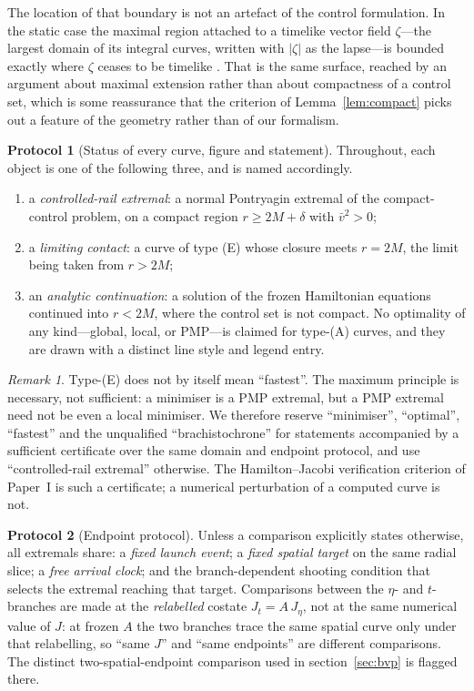 \documentclass[12pt]{iopart}
\theoremstyle{plain}
\theoremstyle{definition}
\newtheorem{protocol}{Protocol}
\theoremstyle{remark}
\newtheorem{remark}[proposition]{Remark}
\begin{document}
The location of that boundary is not an artefact of the control formulation. In
the static case the maximal region attached to a timelike vector field
$\zeta$---the largest domain of its integral curves, written with $|\zeta|$ as
the lapse---is bounded exactly where $\zeta$ ceases to be timelike
\cite{Lecian2025Cauchy}. That is the same surface, reached by an argument about
maximal extension rather than about compactness of a control set, which is some
reassurance that the criterion of Lemma~\ref{lem:compact} picks out a feature of
the geometry rather than of our formalism.

\begin{protocol}[Status of every curve, figure and statement]
\label{prot:status}
Throughout, each object is one of the following three, and is named accordingly.
\begin{enumerate}
\item[\rm(E)] a \emph{controlled-rail extremal}: a normal Pontryagin extremal of
the compact-control problem, on a compact region $r\ge2M+\delta$ with
$\bar v^2>0$;
\item[\rm(C)] a \emph{limiting contact}: a curve of type (E) whose closure meets
$r=2M$, the limit being taken from $r>2M$;
\item[\rm(A)] an \emph{analytic continuation}: a solution of the frozen
Hamiltonian equations continued into $r<2M$, where the control set is not
compact. No optimality of any kind---global, local, or PMP---is claimed for
type-(A) curves, and they are drawn with a distinct line style and legend entry.
\end{enumerate}
\end{protocol}

\begin{remark}
Type-(E) does not by itself mean ``fastest''. The maximum principle is necessary,
not sufficient: a minimiser is a PMP extremal, but a PMP extremal need not be
even a local minimiser. We therefore reserve ``minimiser'', ``optimal'',
``fastest'' and the unqualified ``brachistochrone'' for statements accompanied by
a sufficient certificate over the same domain and endpoint protocol, and use
``controlled-rail extremal'' otherwise. The Hamilton--Jacobi verification
criterion of Paper~I is such a certificate; a numerical perturbation of a
computed curve is not.
\end{remark}

\begin{protocol}[Endpoint protocol]
\label{prot:endpoint}
Unless a comparison explicitly states otherwise, all extremals share: a
\emph{fixed launch event}; a \emph{fixed spatial target} on the same radial slice;
a \emph{free arrival clock}; and the branch-dependent shooting condition that
selects the extremal reaching that target. Comparisons between the $\eta$- and
$t$-branches are made at the \emph{relabelled} costate $J_t=A\,J_\eta$, not at the
same numerical value of $J$: at frozen $A$ the two branches trace the same spatial
curve only under that relabelling, so ``same $J$'' and ``same endpoints'' are
different comparisons. The distinct two-spatial-endpoint comparison used in
section~\ref{sec:bvp} is flagged there.
\end{protocol}
\end{document}
